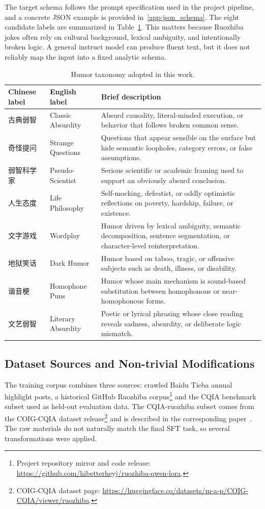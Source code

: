\documentclass{article}
\begin{document}
The target schema follows the prompt specification used in the project pipeline, and a concrete JSON example is provided in~\ref{app:json_schema}. The eight candidate labels are summarized in Table~\ref{tab:category_taxonomy}. This matters because Ruozhiba jokes often rely on cultural background, lexical ambiguity, and intentionally broken logic. A general instruct model can produce fluent text, but it does not reliably map the input into a fixed analytic schema.

\begin{table}[t]
\centering
\small
\caption{Humor taxonomy adopted in this work.}
\label{tab:category_taxonomy}
\begin{tabularx}{\textwidth}{>{\raggedright\arraybackslash}p{} >{\raggedright\arraybackslash}p{} X}
\toprule
Chinese label & English label & Brief description \\
\midrule
古典弱智 & Classic Absurdity & Absurd causality, literal-minded execution, or behavior that follows broken common sense. \\
奇怪提问 & Strange Questions & Questions that appear sensible on the surface but hide semantic loopholes, category errors, or false assumptions. \\
弱智科学家 & Pseudo-Scientist & Serious scientific or academic framing used to support an obviously absurd conclusion. \\
人生态度 & Life Philosophy & Self-mocking, defeatist, or oddly optimistic reflections on poverty, hardship, failure, or existence. \\
文字游戏 & Wordplay & Humor driven by lexical ambiguity, semantic decomposition, sentence segmentation, or character-level reinterpretation. \\
地狱笑话 & Dark Humor & Humor based on taboo, tragic, or offensive subjects such as death, illness, or disability. \\
谐音梗 & Homophone Puns & Humor whose main mechanism is sound-based substitution between homophonous or near-homophonous forms. \\
文艺弱智 & Literary Absurdity & Poetic or lyrical phrasing whose close reading reveals sadness, absurdity, or deliberate logic mismatch. \\
\bottomrule
\end{tabularx}
\end{table}

\subsection{Dataset Sources and Non-trivial Modifications}
The training corpus combines three sources: crawled Baidu Tieba annual highlight posts, a historical GitHub Ruozhiba corpus\footnote{Project repository mirror and code release: \url{https://github.com/hibetterheyj/ruozhiba-qwen-lora}.} and the CQIA benchmark subset used as held-out evaluation data. The CQIA-ruozhiba subset comes from the COIG-CQIA dataset release\footnote{COIG-CQIA dataset page: \url{https://huggingface.co/datasets/m-a-p/COIG-CQIA/viewer/ruozhiba}.} and is described in the corresponding paper~\cite{Bai2024COIG-CQIA}. The raw materials do not naturally match the final SFT task, so several transformations were applied.
\end{document}
